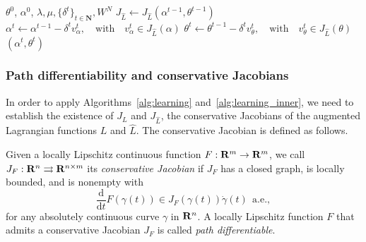 \begin{algorithm}[ht]
	\caption{Stochastic gradient descent for the inner loop}
	\label{alg:learning_inner}
	\begin{algorithmic}[1]
	  $\theta^0$, $\alpha^0$, $\lambda, \mu,\{\delta^t\}_{t \in \mathbf{N}}, W^N$
	\State {}
	 \State {}
	 \State $J_{\hat{L}} \gets J_{\hat{L}}(\alpha^{t-1},\theta^{t-1})$  
  \State $\alpha^{t} \gets \alpha^{t-1} - \delta^{t} v_{\alpha}^{t},\quad \text{with}\quad v_{\alpha}^{t} \in J_{\hat{L}}(\alpha)$
\State $\theta^{t} \gets \theta^{t-1} - \delta^t v_{\theta}^{t},\quad \text{with}\quad v_{\theta}^{t} \in J_{\hat{L}}(\theta)$
  \EndFor
	  $(\alpha^t, \theta^t)$
	\end{algorithmic}
\end{algorithm} 

\subsubsection{Path differentiability and conservative Jacobians}
In order to apply Algorithms~\ref{alg:learning} and~\ref{alg:learning_inner}, we need to establish the existence of $J_L$ and $J_{\hat{L}}$, the conservative Jacobians of the augmented Lagrangian functions $L$ and $\hat{L}$. 
The conservative Jacobian is defined as follows. 

\begin{definition}
\label{def:conserve}
Given a locally Lipschitz continuous function $F:{\mathbf R}^{m} \rightarrow {\mathbf R}^m$, we call $J_F:{\mathbf R}^{n} \rightrightarrows {\mathbf R}^{n\times m}$ its {\it conservative Jacobian} if $J_F$ has a closed graph, is locally bounded, and is nonempty with $$\frac{\text{d}}{\text{d} t}F(\gamma(t))\in J_F(\gamma(t))\dot{\gamma}(t)~~\text{a.e.},$$
for any absolutely continuous curve $\gamma$ in ${\mathbf R}^n$. 
A locally Lipschitz function $F$ that admits a conservative Jacobian $J_F$ is called {\it path differentiable}.
\end{definition}


